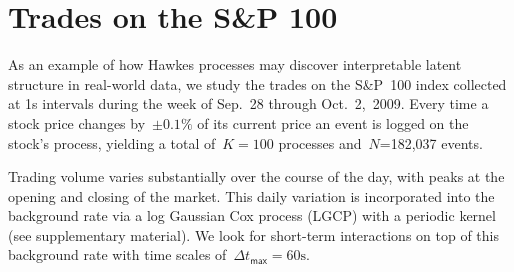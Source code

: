 \section{Trades on the S\&P 100}
\label{sec:financial}
As an example of how Hawkes processes may discover interpretable latent structure in real-world data, we study the trades on the S\&P~100 index collected at 1s intervals during the week of Sep.~28 through Oct.~2,~2009. Every time a stock price changes by~${\pm0.1\%}$ of its current price an event is logged on the stock's process, yielding a total of~${K=100}$ processes and~${N}$=182,037 events.

Trading volume varies substantially over the course of the day, with peaks at the opening and closing of the market. This daily variation is incorporated into the background rate via a log Gaussian Cox process (LGCP) with a periodic kernel (see supplementary material). We look for short-term interactions on top of this background rate with time scales of~${\Delta t_{\textsf{max}}=60\mathrm{s}}$.

